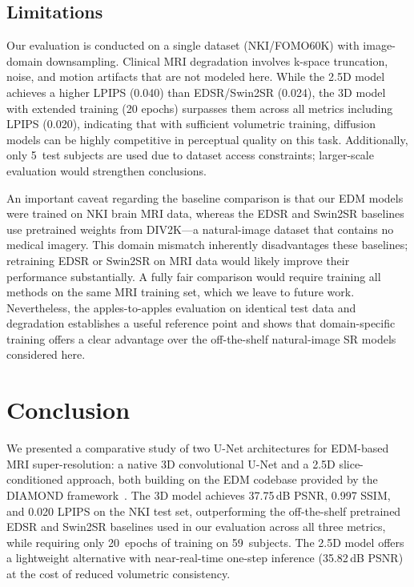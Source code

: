 \documentclass[10pt,journal]{IEEEtran}
\begin{document}
\subsection{Limitations}
Our evaluation is conducted on a single dataset (NKI/FOMO60K) with
image-domain downsampling.  Clinical MRI degradation involves k-space
truncation, noise, and motion artifacts that are not modeled here.
While the 2.5D model achieves a higher LPIPS (0.040) than EDSR/Swin2SR
(0.024), the 3D model with extended training (20 epochs) surpasses
them across all metrics including LPIPS (0.020), indicating that
with sufficient volumetric training, diffusion models can be highly
competitive in perceptual quality on this task.
Additionally, only 5~test subjects are used due to dataset access
constraints; larger-scale evaluation would strengthen conclusions.

An important caveat regarding the baseline comparison is that our EDM
models were trained on NKI brain MRI data, whereas the EDSR and Swin2SR
baselines use pretrained weights from DIV2K---a natural-image dataset
that contains no medical imagery.  This domain mismatch inherently
disadvantages these baselines; retraining EDSR or Swin2SR on MRI data
would likely improve their performance substantially.  A fully fair
comparison would require training all methods on the same MRI training
set, which we leave to future work.  Nevertheless, the apples-to-apples
evaluation on identical test data and degradation establishes a useful
reference point and shows that domain-specific training offers a clear
advantage over the off-the-shelf natural-image SR models considered here.

\section{Conclusion}
\label{sec:conclusion}

We presented a comparative study of two U-Net architectures for
EDM-based MRI super-resolution: a native 3D convolutional U-Net and a
2.5D slice-conditioned approach, both building on the EDM codebase
provided by the DIAMOND framework~\cite{b20}.  The 3D model achieves
37.75\,dB PSNR, 0.997 SSIM, and 0.020 LPIPS on the NKI test set,
outperforming the off-the-shelf pretrained EDSR and Swin2SR baselines
used in our evaluation across all three metrics, while requiring only
20~epochs of training on 59~subjects.
The 2.5D model offers a lightweight alternative with near-real-time
one-step inference (35.82\,dB PSNR) at the cost of reduced volumetric
consistency.
\end{document}
